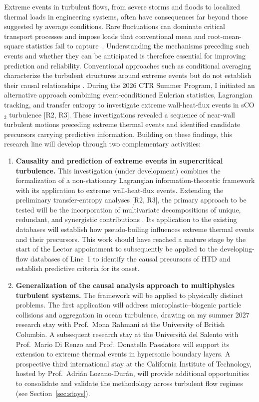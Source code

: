 \documentclass[11pt]{article}
\begin{document}
Extreme events in turbulent flows, from severe storms and floods to localized thermal loads in engineering systems, often have consequences far beyond those suggested by average conditions.
Rare fluctuations can dominate critical transport processes and impose loads that conventional mean and root-mean-square statistics fail to capture~\cite{Guerrero2020}.
Understanding the mechanisms preceding such events and whether they can be anticipated is therefore essential for improving prediction and reliability.
Conventional approaches such as conditional averaging characterize the turbulent structures around extreme events but do not establish their causal relationships \cite{Hack2021,Zhang2023}.
During the 2026 CTR Summer Program, I initiated an alternative approach combining event-conditioned Eulerian statistics, Lagrangian tracking, and transfer entropy to investigate extreme wall-heat-flux events in sCO$_2$ turbulence [R2, R3].
These investigations revealed a sequence of near-wall turbulent motions preceding extreme thermal events and identified candidate precursors carrying predictive information.
Building on these findings, this research line will develop through two complementary activities:
\begin{enumerate}
	\item \textbf{Causality and prediction of extreme events in supercritical turbulence.}
	This investigation (under development) combines the formalization of a non-stationary Lagrangian information-theoretic framework with its application to extreme wall-heat-flux events.
	Extending the preliminary transfer-entropy analyses [R2, R3], the primary approach to be tested will be the incorporation of multivariate decompositions of unique, redundant, and synergistic contributions \cite{MartinezSanchez2024}.
	Its application to the existing databases will establish how pseudo-boiling influences extreme thermal events and their precursors.
	This work should have reached a mature stage by the start of the Lector appointment to subsequently be applied to the developing-flow databases of Line~1 to identify the causal precursors of HTD and establish predictive criteria for its onset.
	
	\item \textbf{Generalization of the causal analysis approach to multiphysics turbulent systems.}
	The framework will be applied to physically distinct problems.
	The first application will address microplastic--biogenic particle collisions and aggregation in ocean turbulence, drawing on my summer 2027 research stay with Prof.~Mona Rahmani at the University of British Columbia.
	A subsequent research stay at the Universit\`a del Salento with Prof.~Mario Di Renzo and Prof.~Donatella Passiatore will support its extension to extreme thermal events in hypersonic boundary layers.
	A prospective third international stay at the California Institute of Technology, hosted by Prof.~Adrián Lozano-Durán, will provide additional opportunities to consolidate and validate the methodology across turbulent flow regimes (see Section~\ref{sec:stays}).
\end{enumerate}
\end{document}
